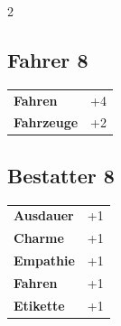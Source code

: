 \begin{multicols}{2}
\begin{tcolorbox}

\end{tcolorbox}

\begin{tcolorbox}
    \subsection*{Fahrer \hfill \small{8 }}
    \tcblower




\begin{tabular}{@{}ll@{}}
    \textbf{Fahren} & +4\\
    \textbf{Fahrzeuge} & +2\\
\end{tabular}


\end{tcolorbox}

\begin{tcolorbox}
    \subsection*{Bestatter \hfill \small{8 }}
    \tcblower




\begin{tabular}{@{}ll@{}}
    \textbf{Ausdauer} & +1\\
    \textbf{Charme} & +1\\
    \textbf{Empathie} & +1\\
    \textbf{Fahren} & +1\\
    \textbf{Etikette} & +1\\
\end{tabular}



\end{tcolorbox}
\end{multicols}
